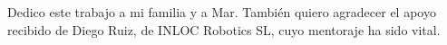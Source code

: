 \documentclass[../main.tex]{subfiles}
\begin{document}
Dedico este trabajo a mi familia y a Mar. También quiero agradecer el apoyo recibido de Diego Ruiz, de INLOC Robotics SL, cuyo mentoraje ha sido vital.
\end{document}
